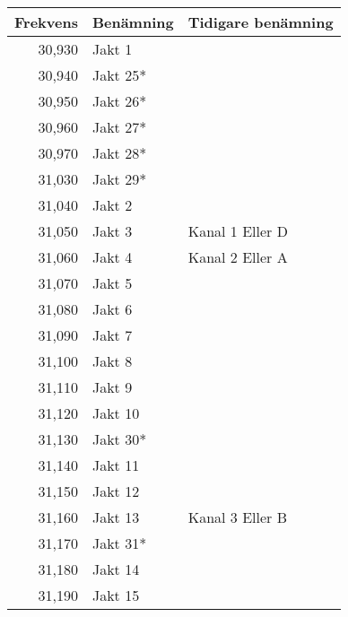 \begin{longtable}{rll}
\textbf{Frekvens} & \textbf{Benämning} & \textbf{Tidigare benämning} \\ \hline \endhead
30,930            & Jakt 1             &                             \\
30,940            & Jakt 25*           &                             \\
30,950            & Jakt 26*           &                             \\
30,960            & Jakt 27*           &                             \\
30,970            & Jakt 28*           &                             \\
31,030            & Jakt 29*           &                             \\
31,040            & Jakt 2             &                             \\
31,050            & Jakt 3             & Kanal 1 Eller D             \\
31,060            & Jakt 4             & Kanal 2 Eller A             \\
31,070            & Jakt 5             &                             \\
31,080            & Jakt 6             &                             \\
31,090            & Jakt 7             &                             \\
31,100            & Jakt 8             &                             \\
31,110            & Jakt 9             &                             \\
31,120            & Jakt 10            &                             \\
31,130            & Jakt 30*           &                             \\
31,140            & Jakt 11            &                             \\
31,150            & Jakt 12            &                             \\
31,160            & Jakt 13            & Kanal 3 Eller B             \\
31,170            & Jakt 31*           &                             \\
31,180            & Jakt 14            &                             \\
31,190            & Jakt 15            &                             \\

\end{longtable}
